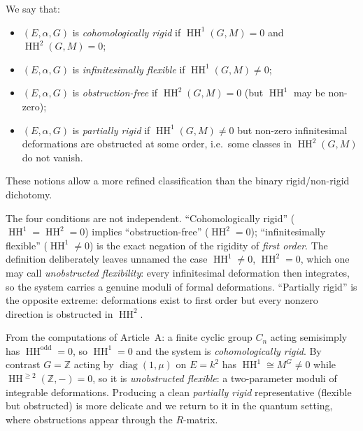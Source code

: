 \documentclass[11pt,a4paper]{article}
\numberwithin{equation}{section}
\newcommand{\Z}{\mathbb{Z}}
\DeclareMathOperator{\HH}{HH}
\newcommand{\TwinSpace}{(E,\alpha,G)}
\begin{document}
	\begin{definition}
		\label{def:rigid-flex}
		We say that:
		\begin{itemize}
			\item $\TwinSpace$ is \emph{cohomologically rigid} if $\HH^1(G,M)=0$ and $\HH^2(G,M)=0$;
			\item $\TwinSpace$ is \emph{infinitesimally flexible} if $\HH^1(G,M)\neq 0$;
			\item $\TwinSpace$ is \emph{obstruction-free} if $\HH^2(G,M)=0$ (but $\HH^1$ may be non-zero);
			\item $\TwinSpace$ is \emph{partially rigid} if $\HH^1(G,M)\neq 0$ but non-zero infinitesimal deformations
			are obstructed at some order, i.e.\ some classes in $\HH^2(G,M)$ do not vanish.
		\end{itemize}
	\end{definition}
	
	These notions allow a more refined classification than the binary rigid/non-rigid dichotomy.

	\begin{remark}\label{rem:class-relations}
		The four conditions are not independent. ``Cohomologically rigid'' ($\HH^1=\HH^2=0$) implies
		``obstruction-free'' ($\HH^2=0$); ``infinitesimally flexible'' ($\HH^1\neq0$) is the exact negation of the
		rigidity of \emph{first order}. The definition deliberately leaves unnamed the case $\HH^1\neq0$,
		$\HH^2=0$, which one may call \emph{unobstructed flexibility}: every infinitesimal deformation then
		integrates, so the system carries a genuine moduli of formal deformations. ``Partially rigid'' is the
		opposite extreme: deformations exist to first order but every nonzero direction is obstructed in $\HH^2$.
	\end{remark}

	\begin{example}\label{ex:rigidity-reps}
		From the computations of Article~A: a finite cyclic group $C_n$ acting semisimply has $\HH^{\mathrm{odd}}=0$,
		so $\HH^1=0$ and the system is \emph{cohomologically rigid}. By contrast $G=\Z$ acting by
		$\operatorname{diag}(1,\mu)$ on $E=k^2$ has $\HH^1\cong M^G\neq0$ while $\HH^{\ge2}(\Z,-)=0$, so it is
		\emph{unobstructed flexible}: a two-parameter moduli of integrable deformations. Producing a clean
		\emph{partially rigid} representative (flexible but obstructed) is more delicate and we return to it in the
		quantum setting, where obstructions appear through the $R$-matrix.
	\end{example}
	
\end{document}
